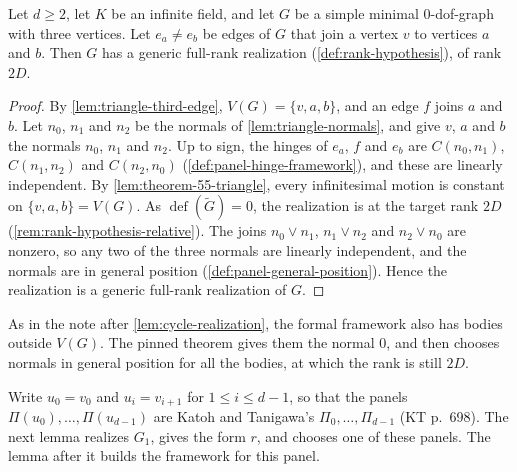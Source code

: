 \begin{lemma}
  \label{lem:triangle-realization}
  \leanok
  Let $d \ge 2$, let $K$ be an infinite field, and let $G$ be a simple
  minimal $0$-dof-graph with three vertices. Let $e_a \neq e_b$ be edges
  of $G$ that join a vertex $v$ to vertices $a$ and $b$. Then $G$ has a
  generic full-rank realization (\cref{def:rank-hypothesis}), of rank
  $2D$.
\end{lemma}
\begin{proof}
  \leanok
  By \cref{lem:triangle-third-edge}, $V(G) = \{v, a, b\}$, and an edge
  $f$ joins $a$ and $b$. Let $n_0$, $n_1$ and $n_2$ be the normals of
  \cref{lem:triangle-normals}, and give $v$, $a$ and $b$ the normals
  $n_0$, $n_1$ and $n_2$. Up to sign, the hinges of $e_a$, $f$ and
  $e_b$ are $C(n_0, n_1)$, $C(n_1, n_2)$ and $C(n_2, n_0)$
  (\cref{def:panel-hinge-framework}), and these are linearly
  independent. By \cref{lem:theorem-55-triangle}, every infinitesimal
  motion is constant on $\{v, a, b\} = V(G)$. As
  $\operatorname{def}(\tilde G) = 0$, the realization is at the target
  rank $2D$ (\cref{rem:rank-hypothesis-relative}). The joins
  $n_0 \vee n_1$, $n_1 \vee n_2$ and $n_2 \vee n_0$ are nonzero, so any
  two of the three normals are linearly independent, and the normals
  are in general position (\cref{def:panel-general-position}). Hence
  the realization is a generic full-rank realization of $G$.
\end{proof}

\begin{fmlnote}
  As in the note after \cref{lem:cycle-realization}, the formal
  framework also has bodies outside $V(G)$. The pinned theorem gives
  them the normal $0$, and then chooses normals in general position for
  all the bodies, at which the rank is still $2D$.
\end{fmlnote}

Write $u_0 = v_0$ and $u_i = v_{i+1}$ for $1 \le i \le d - 1$, so that
the panels $\Pi(u_0), \dots, \Pi(u_{d-1})$ are Katoh and Tanigawa's
$\Pi_0, \dots, \Pi_{d-1}$ (KT p.~698). The next lemma realizes $G_1$,
gives the form $r$, and chooses one of these panels. The lemma after it
builds the framework for this panel.

